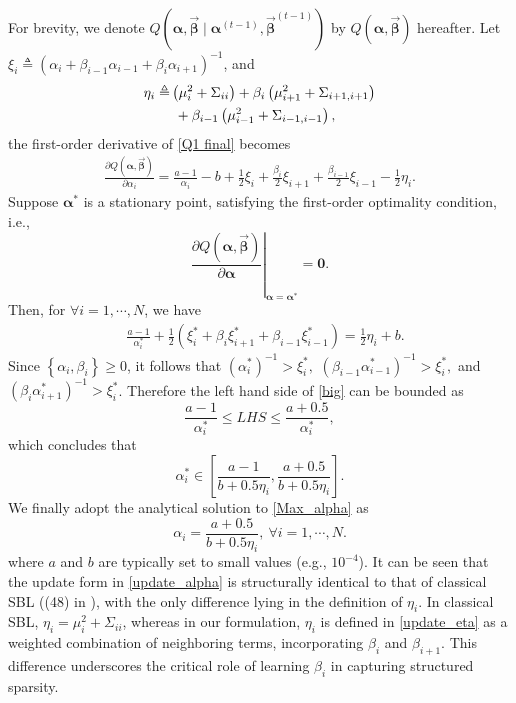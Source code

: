 \documentclass[lettersize,journal]{IEEEtran}
\theoremstyle{remark}
\begin{document}
For brevity, we denote $Q(\boldsymbol{\alpha}, \vec{\boldsymbol{\beta}} \mid \boldsymbol{\alpha}^{(t-1)}, \vec{\boldsymbol{\beta}}^{(t-1)})$ by $Q\left(\boldsymbol{\alpha}, \vec{\boldsymbol{\beta}}\right)$ hereafter.  Let $\xi_i \triangleq  (\alpha_i+\beta_{i-1} \alpha_{i-1}+\beta_i\alpha_{i+1})^{-1}  $, and
\begin{align}
	\eta_i \triangleq &\left(\mu_i^2 + \Sigma_{ii} \right) + \beta_i \left(\mu_{i+1}^2 + \Sigma_{i+1,i+1} \right)  \notag \\
	&~ +\beta_{i-1} \left(\mu_{i-1}^2 + \Sigma_{i-1,i-1} \right), \label{update_eta}
\end{align}
the first-order derivative of \eqref{Q1 final} becomes
	\begin{align*}
	\frac{\partial Q\left(\boldsymbol{\alpha}, \vec{\boldsymbol{\beta}}\right)}{\partial \alpha_{i}}= \frac{a-1}{\alpha_i}-b+\frac{1}{2}\xi_i +\frac{\beta_i}{2}\xi_{i+1} +\frac{\beta_{i-1}}{2}\xi_{i-1}-\frac{1}{2}\eta_i.
\end{align*}
Suppose $\boldsymbol{\alpha}^*$
is a stationary point, satisfying the first-order optimality condition, i.e.,
\begin{equation}
	\left.\frac{\partial Q(\boldsymbol{\alpha}, \vec{\boldsymbol{\beta}})}{\partial \boldsymbol{\alpha}} \right|_{\boldsymbol{\alpha}=\boldsymbol{\alpha}^*}=\mathbf{0}.
\end{equation}
Then, for $\forall i=1,\cdots, N$, we have
\begin{align}
	& \frac{a-1}{\alpha_i^*}+\frac{1}{2}\left(\xi_i^*+\beta_{i} \xi_{i+1}^*+\beta_{i-1}\xi_{i-1}^*\right) = \frac{1}{2}\eta_i +b\label{big}.
\end{align}
Since $\left\{\alpha_i, \beta_i\right\}\ge 0 $,  it follows that $(\alpha_i^*)^{-1}>\xi_i^*,$ $ (\beta_{i-1}\alpha_{i-1}^*)^{-1}>\xi_i^*,$ and $ (\beta_{i}\alpha_{i+1}^*)^{-1}>\xi_i^*$. Therefore the left hand side of \eqref{big} can be bounded as
\begin{equation*}
	\frac{a-1}{\alpha_i^*}\le LHS \le 	\frac{a+0.5}{\alpha_i^*},
\end{equation*}
which concludes that 
\begin{equation*}
	\alpha_i^* \in \left[\frac{a-1}{b+0.5\eta_i}, \frac{a+0.5}{b+0.5\eta_i}\right].
\end{equation*}
We finally adopt the analytical solution to \eqref{Max_alpha} as
\begin{equation}
	\alpha_i = \frac{a+0.5}{b+0.5\eta_i}, ~\forall i=1,\cdots,N. \label{update_alpha}
\end{equation}
where \( a \) and \( b \) are typically set to small values (e.g., $10^{-4}$). 
It can be seen that the update form in \eqref{update_alpha} is structurally identical to that of classical SBL ((48) in \cite{tipping2001sparse}), with the only difference lying in the definition of \(\eta_i\). In classical SBL, \(\eta_i = \mu_i^2 + \Sigma_{ii}\), whereas in our formulation, \(\eta_i\) is defined in \eqref{update_eta} as a weighted combination of neighboring terms, incorporating \(\beta_i\) and \(\beta_{i+1}\). This difference underscores the critical role of learning \(\beta_i\) in capturing structured sparsity.
\end{document}
